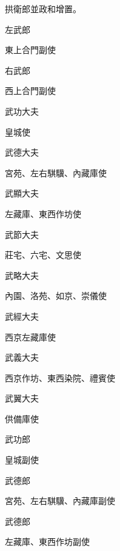 \begin{pinyinscope}
 拱衛郎並政和增置。



 左武郎



 東上合門副使



 右武郎



 西上合門副使



 武功大夫



 皇城使



 武德大夫



 宮苑、左右騏驥、內藏庫使



 武顯大夫



 左藏庫、東西作坊使



 武節大夫



 莊宅、六宅、文思使



 武略大夫



 內園、洛苑、如京、崇儀使



 武經大夫



 西京左藏庫使



 武義大夫



 西京作坊、東西染院、禮賓使



 武翼大夫



 供備庫使



 武功郎



 皇城副使



 武德郎



 宮苑、左右騏驥、內藏庫副使



 武德郎



 左藏庫、東西作坊副使




\end{pinyinscope}
